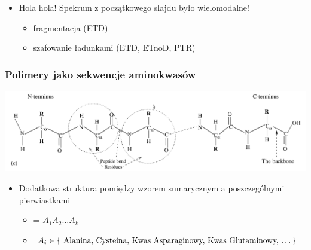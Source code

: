 \documentclass[xetex]{beamer}
\begin{document}
\begin{frame}
		\begin{itemize}
			\item Hola hola! Spekrum z początkowego slajdu było wielomodalne!
			\begin{itemize}
				\item fragmentacja (ETD)
				\item szafowanie ładunkami (ETD, ETnoD, PTR)
			\end{itemize}
		\end{itemize}
	\end{frame}	


	\begin{frame}\frametitle{Polimery jako sekwencje aminokwasów}
		\begin{center}
			\includegraphics[height=.35\textheight, keepaspectratio]{./picts/aminos.png}
		\end{center}		

		\begin{itemize}
			\item Dodatkowa struktura pomiędzy wzorem sumarycznym a poszczególnymi pierwiastkami
			\begin{itemize}
				\item[] \molecule = $A_1 A_2 \dots A_k$
				\item[] $A_i \in \{ \text{
				Alanina, Cysteina, Kwas Asparaginowy, Kwas Glutaminowy, \dots
				} \}$
			\end{itemize}
		\end{itemize}

	\end{frame}

\end{document}
